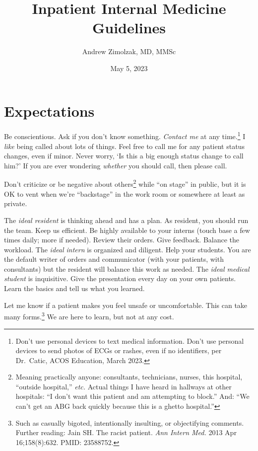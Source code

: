 \documentclass{tufte-handout}
\title{Inpatient Internal Medicine Guidelines}
\author{Andrew Zimolzak, MD, MMSc}
\date{May 5, 2023}
\begin{document}
\maketitle

\section{Expectations}

Be conscientious. Ask if you don't know something. \emph{Contact me}
at any time.\footnote{Don't use personal devices to text medical
information. Don't use personal devices to send photos of ECGs or
rashes, even if no identifiers, per Dr.\ Catic, ACOS Education, March
2023.} I \emph{like} being called about lots of things. Feel free to
call me for any patient status changes, even if minor. Never worry,
`Is this a big enough status change to call him?' If you are ever
wondering \emph{whether} you should call, then please call.

Don't criticize or be negative about others\footnote{Meaning
practically anyone: consultants, technicians, nurses, this hospital,
``outside hospital,'' \emph{etc.} Actual things I have heard in
hallways at other hospitals: ``I don't want this patient and am
attempting to block.'' And: ``We can't get an ABG back quickly because
this is a ghetto hospital.''} while ``on stage'' in public, but it is
OK to vent when we're ``backstage'' in the work room or somewhere at
least as private.

The \emph{ideal resident} is thinking ahead and has a plan. As
resident, you should run the team. Keep us efficient. Be highly
available to your interns (touch base a few times daily; more if
needed). Review their orders. Give feedback. Balance the workload. The
\emph{ideal intern} is organized and diligent. Help your students. You
are the default writer of orders and communicator (with your patients,
with consultants) but the resident will balance this work as needed.
The \emph{ideal medical student} is inquisitive. Give the presentation
every day on your own patients. Learn the basics and tell us what you
learned.

Let me know if a patient makes you feel unsafe or uncomfortable. This
can take many forms.\footnote{Such as casually bigoted, intentionally
insulting, or objectifying comments. Further reading: Jain SH. The
racist patient. \emph{Ann Intern Med.} 2013 Apr 16;158(8):632. PMID:
23588752.} We are here to learn, but not at any cost.
\end{document}
